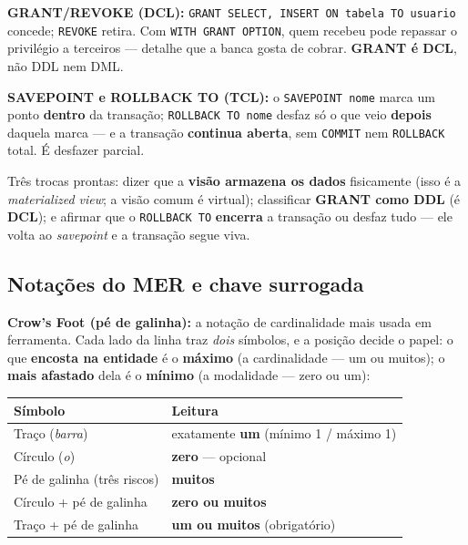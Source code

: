 \textbf{GRANT/REVOKE (DCL):} \texttt{GRANT SELECT, INSERT ON tabela TO
usuario} concede; \texttt{REVOKE} retira. Com \texttt{WITH GRANT OPTION}, quem
recebeu pode repassar o privilégio a terceiros --- detalhe que a banca gosta
de cobrar. \textbf{GRANT é DCL}, não DDL nem DML.

\textbf{SAVEPOINT e ROLLBACK TO (TCL):} o \texttt{SAVEPOINT nome} marca um
ponto \textbf{dentro} da transação; \texttt{ROLLBACK TO nome} desfaz só o que
veio \textbf{depois} daquela marca --- e a transação \textbf{continua aberta},
sem \texttt{COMMIT} nem \texttt{ROLLBACK} total. É desfazer parcial.

\begin{pegadinha}
Três trocas prontas: dizer que a \textbf{visão armazena os dados}
fisicamente (isso é a \emph{materialized view}; a visão comum é virtual);
classificar \textbf{GRANT como DDL} (é \textbf{DCL}); e afirmar que o
\texttt{ROLLBACK TO} \textbf{encerra} a transação ou desfaz tudo --- ele
volta ao \emph{savepoint} e a transação segue viva.
\end{pegadinha}

\subsection{Notações do MER e chave surrogada}

\textbf{Crow's Foot (pé de galinha):} a notação de cardinalidade mais usada em
ferramenta. Cada lado da linha traz \emph{dois} símbolos, e a posição decide o
papel: o que \textbf{encosta na entidade} é o \textbf{máximo} (a cardinalidade
--- um ou muitos); o \textbf{mais afastado} dela é o \textbf{mínimo} (a
modalidade --- zero ou um):

\begin{center}
\begin{tabular}{@{}p{4.6cm}p{7.4cm}@{}}
\toprule
\textbf{Símbolo} & \textbf{Leitura} \\
\midrule
Traço (\emph{barra}) & exatamente \textbf{um} (mínimo 1 / máximo 1) \\
Círculo (\emph{o}) & \textbf{zero} --- opcional \\
Pé de galinha (três riscos) & \textbf{muitos} \\
Círculo + pé de galinha & \textbf{zero ou muitos} \\
Traço + pé de galinha & \textbf{um ou muitos} (obrigatório) \\
\bottomrule
\end{tabular}
\end{center}

